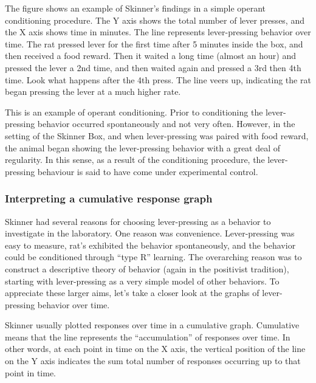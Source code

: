 \documentclass[
  oneside,
  12pt]{crumpbook}
\begin{document}
The figure shows an example of Skinner's findings in a simple operant conditioning procedure. The Y axis shows the total number of lever presses, and the X axis shows time in minutes. The line represents lever-pressing behavior over time. The rat pressed lever for the first time after 5 minutes inside the box, and then received a food reward. Then it waited a long time (almost an hour) and pressed the lever a 2nd time, and then waited again and pressed a 3rd then 4th time. Look what happens after the 4th press. The line veers up, indicating the rat began pressing the lever at a much higher rate.

This is an example of operant conditioning. Prior to conditioning the lever-pressing behavior occurred spontaneously and not very often. However, in the setting of the Skinner Box, and when lever-pressing was paired with food reward, the animal began showing the lever-pressing behavior with a great deal of regularity. In this sense, as a result of the conditioning procedure, the lever-pressing behaviour is said to have come under experimental control.

\hypertarget{interpreting-a-cumulative-response-graph}{%
\subsubsection{Interpreting a cumulative response graph}\label{interpreting-a-cumulative-response-graph}}

Skinner had several reasons for choosing lever-pressing as a behavior to investigate in the laboratory. One reason was convenience. Lever-pressing was easy to measure, rat's exhibited the behavior spontaneously, and the behavior could be conditioned through ``type R'' learning. The overarching reason was to construct a descriptive theory of behavior (again in the positivist tradition), starting with lever-pressing as a very simple model of other behaviors. To appreciate these larger aims, let's take a closer look at the graphs of lever-pressing behavior over time.

Skinner usually plotted responses over time in a cumulative graph. Cumulative means that the line represents the ``accumulation'' of responses over time. In other words, at each point in time on the X axis, the vertical position of the line on the Y axis indicates the sum total number of responses occurring up to that point in time.
\end{document}
